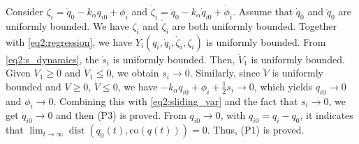 Consider
$
\zeta_i = \dot{q}_0 - k_{\alpha} {q}_{i0} + \phi_i
$
and
$
\dot{\zeta}_i = \ddot{q}_0 - k_{\alpha} \dot{q}_{i0} + \dot{\phi}_i
$.
Assume that $\dot{q}_0$ and $\ddot{q}_0$ are uniformly bounded. We have $\zeta_i$ and $\dot{\zeta}_i$ are both uniformly bounded.
Together with \eqref{eq2:regression}, we have $Y_{i}(q_{i},\dot{q}_{i},\dot{\zeta}_i,\zeta_i)$ is uniformly bounded.
From \eqref{eq2:s_dynamics}, the $\dot{s}_i$ is uniformly bounded.
Then, $\ddot{V}_1$ is uniformly bounded.
Given $V_1\geq 0$ and $\dot{V}_1\leq 0$, we obtain $s_i\to0$.
Similarly, since $\ddot{V}$ is uniformly bounded and $V\geq 0$, $\dot{V}\leq 0$, we have $-k_\alpha q_{i0} +\phi_i +\frac12 s_i\to0$,
which yields $q_{i0}\to0$ and $\phi_i\to0$.
Combining this with \eqref{eq2:sliding_var} and the fact that $s_i\to0$,  we get $\dot{q}_{i0}\to0$ and then (P3) is proved.
From $q_{i0}\to0$, with $q_{i0}=q_{i} - q_{0}$, it indicates that $\lim_{t\to\infty}\operatorname{dist}(q_0(t),\mathrm{co}(q(t)))=0$.
Thus, (P1) is proved.
%